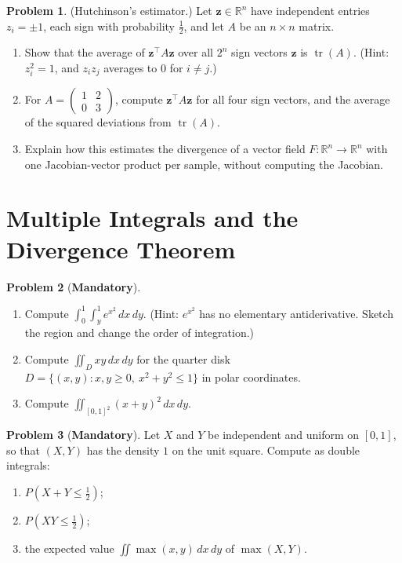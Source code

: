 \documentclass[11pt]{article}
\theoremstyle{definition}
\newtheorem{problem}{Problem}[section]
\newcommand{\mandatory}{\textcolor{red!70!black}{\textbf{Mandatory}}}
\DeclareMathOperator{\tr}{tr}
\begin{document}
\begin{problem}\label{pr:hutchinson}
    (Hutchinson's estimator.) Let $\mathbf{z} \in \mathbb{R}^n$ have independent entries $z_i = \pm 1$, each sign with probability $\frac{1}{2}$, and let $A$ be an $n \times n$ matrix.
    \begin{enumerate}[label=(\alph*)]
        \item Show that the average of $\mathbf{z}^\top A\mathbf{z}$ over all $2^n$ sign vectors $\mathbf{z}$ is $\tr(A)$. (Hint: $z_i^2 = 1$, and $z_iz_j$ averages to $0$ for $i \neq j$.)
        \item For $A = \begin{pmatrix} 1 & 2 \\ 0 & 3 \end{pmatrix}$, compute $\mathbf{z}^\top A\mathbf{z}$ for all four sign vectors, and the average of the squared deviations from $\tr(A)$.
        \item Explain how this estimates the divergence of a vector field $F: \mathbb{R}^n \to \mathbb{R}^n$ with one Jacobian-vector product per sample, without computing the Jacobian.
    \end{enumerate}
\end{problem}

\section{Multiple Integrals and the Divergence Theorem}

\begin{problem}[\mandatory]\label{pr:fubini-practice}
    \begin{enumerate}[label=(\alph*)]
        \item Compute $\int_0^1\int_y^1 e^{x^2}\, dx\, dy$. (Hint: $e^{x^2}$ has no elementary antiderivative. Sketch the region and change the order of integration.)
        \item Compute $\iint_D xy\, dx\, dy$ for the quarter disk $D = \{(x, y) : x, y \geq 0, \ x^2 + y^2 \leq 1\}$ in polar coordinates.
        \item Compute $\iint_{[0, 1]^2} (x + y)^2\, dx\, dy$.
    \end{enumerate}
\end{problem}

\begin{problem}[\mandatory]\label{pr:prob-integrals}
    Let $X$ and $Y$ be independent and uniform on $[0, 1]$, so that $(X, Y)$ has the density $1$ on the unit square. Compute as double integrals:
    \begin{enumerate}[label=(\alph*)]
        \item $P(X + Y \leq \frac{1}{2})$;
        \item $P(XY \leq \frac{1}{2})$;
        \item the expected value $\iint \max(x, y)\, dx\, dy$ of $\max(X, Y)$.
    \end{enumerate}
\end{problem}
\end{document}
